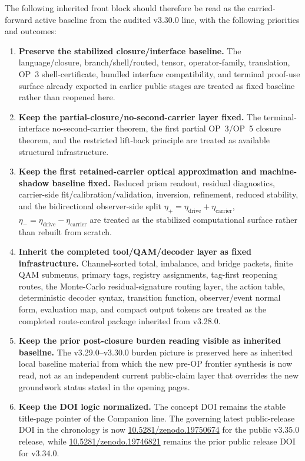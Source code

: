 The following inherited front block should therefore be read as the carried-forward active baseline from the audited v3.30.0 line, with the following priorities and outcomes:
\begin{enumerate}[leftmargin=2em]
  \item \textbf{Preserve the stabilized closure/interface baseline.} The language/closure, branch/shell/routed, tensor, operator-family, translation, OP~3 shell-certificate, bundled interface compatibility, and terminal proof-use surface already exported in earlier public stages are treated as fixed baseline rather than reopened here.
  \item \textbf{Keep the partial-closure/no-second-carrier layer fixed.} The terminal-interface no-second-carrier theorem, the first partial OP~3/OP~5 closure theorem, and the restricted lift-back principle are treated as available structural infrastructure.
  \item \textbf{Keep the first retained-carrier optical approximation and machine-shadow baseline fixed.} Reduced prism readout, residual diagnostics, carrier-side fit/calibration/validation, inversion, refinement, reduced stability, and the bidirectional observer-side split \(\eta_+=\eta_{\mathrm{drive}}+\eta_{\mathrm{carrier}}\), \(\eta_-=\eta_{\mathrm{drive}}-\eta_{\mathrm{carrier}}\) are treated as the stabilized computational surface rather than rebuilt from scratch.
  \item \textbf{Inherit the completed tool/QAM/decoder layer as fixed infrastructure.} Channel-sorted total, imbalance, and bridge packets, finite QAM submenus, primary tags, registry assignments, tag-first reopening routes, the Monte-Carlo residual-signature routing layer, the action table, deterministic decoder syntax, transition function, observer/event normal form, evaluation map, and compact output tokens are treated as the completed route-control package inherited from v3.28.0.
  \item \textbf{Keep the prior post-closure burden reading visible as inherited baseline.} The v3.29.0--v3.30.0 burden picture is preserved here as inherited local baseline material from which the new pre-OP frontier synthesis is now read, not as an independent current public-claim layer that overrides the new groundwork status stated in the opening pages.
  \item \textbf{Keep the DOI logic normalized.} The concept DOI remains the stable title-page pointer of the Companion line. The governing latest public-release DOI in the chronology is now \href{https://doi.org/10.5281/zenodo.19750674}{10.5281/zenodo.19750674} for the public v3.35.0 release, while \href{https://doi.org/10.5281/zenodo.19746821}{10.5281/zenodo.19746821} remains the prior public release DOI for v3.34.0.
\end{enumerate}

